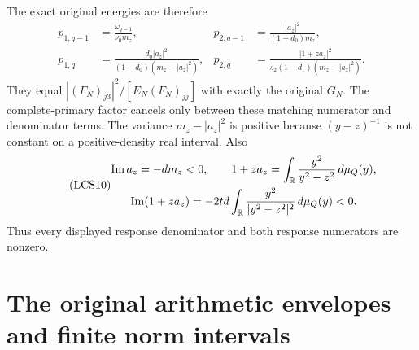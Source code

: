 The exact original energies are therefore
\begin{equation}\tag{LCS9}
\boxed{\begin{aligned}
 p_{1,q-1}&=\frac{\omega_{q-1}}{\nu_0m_z},&
 p_{2,q-1}&=\frac{|a_z|^2}{(1-d_0)m_z},\\
 p_{1,q}&=\frac{d_0|a_z|^2}{(1-d_0)(m_z-|a_z|^2)},&
 p_{2,q}&=\frac{|1+za_z|^2}
 {s_2(1-d_1)(m_z-|a_z|^2)}.
\end{aligned}}
\end{equation}
They equal $|(F_N)_{j3}|^2/[E_N(F_N)_{jj}]$ with exactly the
original $G_N$. The complete-primary factor cancels only between
these matching numerator and denominator terms. The variance
$m_z-|a_z|^2$ is positive because $(y-z)^{-1}$ is not constant
on a positive-density real interval. Also
\begin{equation}\tag{LCS10}
\begin{gathered}
 \operatorname{Im}a_z=-dm_z<0,\qquad
 1+za_z=\int_\mathbb R\frac{y^2}{y^2-z^2}\,d\mu_Q(y),\\
 \operatorname{Im}(1+za_z)
       =-2td\int_\mathbb R\frac{y^2}{|y^2-z^2|^2}\,d\mu_Q(y)<0.
\end{gathered}
\end{equation}
Thus every displayed response denominator and both response
numerators are nonzero.

\section{The original arithmetic envelopes and finite norm intervals}

